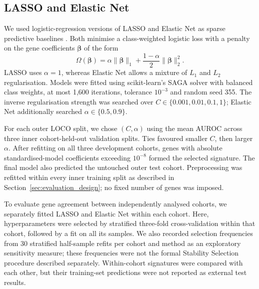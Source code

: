 \subsection{LASSO and Elastic Net}
\label{sec:sparse_methods}
We used logistic-regression versions of LASSO and Elastic Net as sparse predictive baselines \cite{tibshirani1996lasso,zou2005elastic}. Both minimise a class-weighted logistic loss with a penalty on the gene coefficients $\boldsymbol{\beta}$ of the form
\begin{equation}
\Omega(\boldsymbol{\beta})=\alpha\lVert\boldsymbol{\beta}\rVert_1+
\frac{1-\alpha}{2}\lVert\boldsymbol{\beta}\rVert_2^2.
\label{eq:sparse_penalty}
\end{equation}
LASSO uses $\alpha=1$, whereas Elastic Net allows a mixture of $L_1$ and $L_2$ regularisation. Models were fitted using scikit-learn's SAGA solver with balanced class weights, at most 1,600 iterations, tolerance $10^{-3}$ and random seed 355. The inverse regularisation strength was searched over $C\in\{0.001,0.01,0.1,1\}$; Elastic Net additionally searched $\alpha\in\{0.5,0.9\}$.

For each outer LOCO split, we chose $(C,\alpha)$ using the mean AUROC across three inner cohort-held-out validation splits. Ties favoured smaller $C$, then larger $\alpha$. After refitting on all three development cohorts, genes with absolute standardised-model coefficients exceeding $10^{-8}$ formed the selected signature. The final model also predicted the untouched outer test cohort. Preprocessing was refitted within every inner training split as described in Section~\ref{sec:evaluation_design}; no fixed number of genes was imposed.

To evaluate gene agreement between independently analysed cohorts, we separately fitted LASSO and Elastic Net within each cohort. Here, hyperparameters were selected by stratified three-fold cross-validation within that cohort, followed by a fit on all its samples. We also recorded selection frequencies from 30 stratified half-sample refits per cohort and method as an exploratory sensitivity measure; these frequencies were not the formal Stability Selection procedure described separately. Within-cohort signatures were compared with each other, but their training-set predictions were not reported as external test results.
